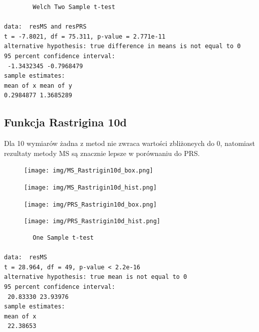 \documentclass{article}
\begin{document}
\begin{verbatim}
        Welch Two Sample t-test

data:  resMS and resPRS
t = -7.8021, df = 75.311, p-value = 2.771e-11
alternative hypothesis: true difference in means is not equal to 0
95 percent confidence interval:
 -1.3432345 -0.7968479
sample estimates:
mean of x mean of y 
0.2984877 1.3685289

\end{verbatim}


\newpage

\subsection{Funkcja Rastrigina 10d} 

\hspace{0.5cm} Dla 10 wymiarów żadna z metod nie zwraca wartości zbliżoneych do 0, natomiast rezultaty metody MS są znacznie lepsze w porównaniu do PRS.

\begin{figure}[H]
    \centering
    \texttt{[image: img/MS\_Rastrigin10d\_box.png]}
    \label{fig:ackley}
\end{figure}

\begin{figure}[H]
    \centering
    \texttt{[image: img/MS\_Rastrigin10d\_hist.png]}
    \label{fig:ackley}
\end{figure}

\begin{figure}[H]
    \centering
    \texttt{[image: img/PRS\_Rastrigin10d\_box.png]}
    \label{fig:ackley}
\end{figure}

\begin{figure}[H]
    \centering
    \texttt{[image: img/PRS\_Rastrigin10d\_hist.png]}
    \label{fig:ackley}
\end{figure}

\newpage
\vspace{25pt}

\begin{verbatim}
        One Sample t-test

data:  resMS
t = 28.964, df = 49, p-value < 2.2e-16
alternative hypothesis: true mean is not equal to 0
95 percent confidence interval:
 20.83330 23.93976
sample estimates:
mean of x
 22.38653
\end{verbatim}

\vspace{50pt}
\end{document}
